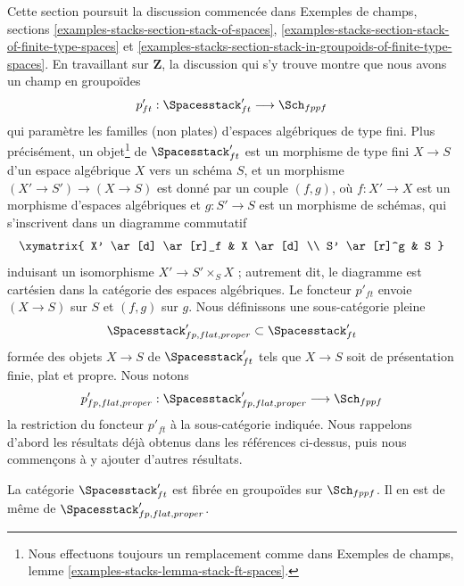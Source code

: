 \noindent
Cette section poursuit la discussion commencée dans
Exemples de champs, sections
\ref{examples-stacks-section-stack-of-spaces},
\ref{examples-stacks-section-stack-of-finite-type-spaces} et
\ref{examples-stacks-section-stack-in-groupoids-of-finite-type-spaces}.
En travaillant sur $\mathbf{Z}$, la discussion qui s'y trouve montre que nous
avons un champ en groupoïdes
$$
p'_{ft} : \Spacesstack'_{ft} \longrightarrow \Sch_{fppf}
$$
qui paramètre les familles (non plates) d'espaces algébriques de type fini.
Plus précisément, un objet\footnote{Nous effectuons toujours un remplacement
comme dans Exemples de champs, lemme
\ref{examples-stacks-lemma-stack-ft-spaces}.}
de $\Spacesstack'_{ft}$ est un morphisme de type fini $X \to S$
d'un espace algébrique $X$ vers un schéma $S$, et un morphisme
$(X' \to S') \to (X \to S)$ est donné par un couple $(f, g)$, où
$f : X' \to X$ est un morphisme d'espaces algébriques et
$g : S' \to S$ est un morphisme de schémas, qui s'inscrivent dans un diagramme
commutatif
$$
\xymatrix{
X' \ar[d] \ar[r]_f & X \ar[d] \\
S' \ar[r]^g & S
}
$$
induisant un isomorphisme $X' \to S' \times_S X$ ; autrement dit, le
diagramme est cartésien dans la catégorie des espaces algébriques.
Le foncteur $p'_{ft}$ envoie $(X \to S)$ sur $S$ et $(f, g)$ sur $g$.
Nous définissons une sous-catégorie pleine
$$
\Spacesstack'_{fp, flat, proper} \subset
\Spacesstack'_{ft}
$$
formée des objets $X \to S$ de $\Spacesstack'_{ft}$ tels que
$X \to S$ soit de présentation finie, plat et propre.
Nous notons
$$
p'_{fp, flat, proper} :
\Spacesstack'_{fp, flat, proper}
\longrightarrow
\Sch_{fppf}
$$
la restriction du foncteur $p'_{ft}$ à la sous-catégorie indiquée.
Nous rappelons d'abord les résultats déjà obtenus dans les références
ci-dessus, puis nous commençons à y ajouter d'autres résultats.

\begin{lemma}
\label{lemma-spaces-fibred-in-groupoids}
La catégorie $\Spacesstack'_{ft}$ est fibrée en groupoïdes
sur $\Sch_{fppf}$. Il en est de même de
$\Spacesstack'_{fp, flat, proper}$.
\end{lemma}

